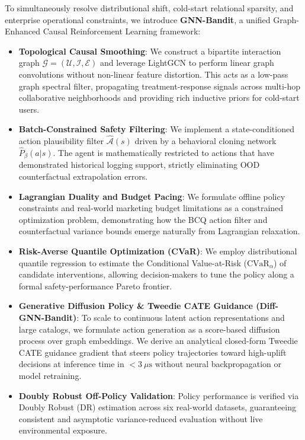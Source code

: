 \documentclass[preprint,12pt,3p]{elsarticle}
\begin{document}
To simultaneously resolve distributional shift, cold-start relational sparsity, and enterprise operational constraints, we introduce \textbf{GNN-Bandit}, a unified Graph-Enhanced Causal Reinforcement Learning framework:
\begin{itemize}
    \item \textbf{Topological Causal Smoothing}: We construct a bipartite interaction graph $\mathcal{G} = (\mathcal{U}, \mathcal{I}, \mathcal{E})$ and leverage LightGCN \cite{he2020lightgcn} to perform linear graph convolutions without non-linear feature distortion. This acts as a low-pass graph spectral filter, propagating treatment-response signals across multi-hop collaborative neighborhoods and providing rich inductive priors for cold-start users.
    \item \textbf{Batch-Constrained Safety Filtering}: We implement a state-conditioned action plausibility filter $\hat{\mathcal{A}}(s)$ driven by a behavioral cloning network $\hat{P}_\beta(a|s)$. The agent is mathematically restricted to actions that have demonstrated historical logging support, strictly eliminating OOD counterfactual extrapolation errors.
    \item \textbf{Lagrangian Duality and Budget Pacing}: We formulate offline policy constraints and real-world marketing budget limitations as a constrained optimization problem, demonstrating how the BCQ action filter and counterfactual variance bounds emerge naturally from Lagrangian relaxation.
    \item \textbf{Risk-Averse Quantile Optimization (CVaR)}: We employ distributional quantile regression to estimate the Conditional Value-at-Risk ($\text{CVaR}_\alpha$) of candidate interventions, allowing decision-makers to tune the policy along a formal safety-performance Pareto frontier.
    \item \textbf{Generative Diffusion Policy \& Tweedie CATE Guidance (Diff-GNN-Bandit)}: To scale to continuous latent action representations and large catalogs, we formulate action generation as a score-based diffusion process over graph embeddings. We derive an analytical closed-form Tweedie CATE guidance gradient that steers policy trajectories toward high-uplift decisions at inference time in $<3\ \mu\text{s}$ without neural backpropagation or model retraining.
    \item \textbf{Doubly Robust Off-Policy Validation}: Policy performance is verified via Doubly Robust (DR) estimation across six real-world datasets, guaranteeing consistent and asymptotic variance-reduced evaluation without live environmental exposure.
\end{itemize}
\end{document}
